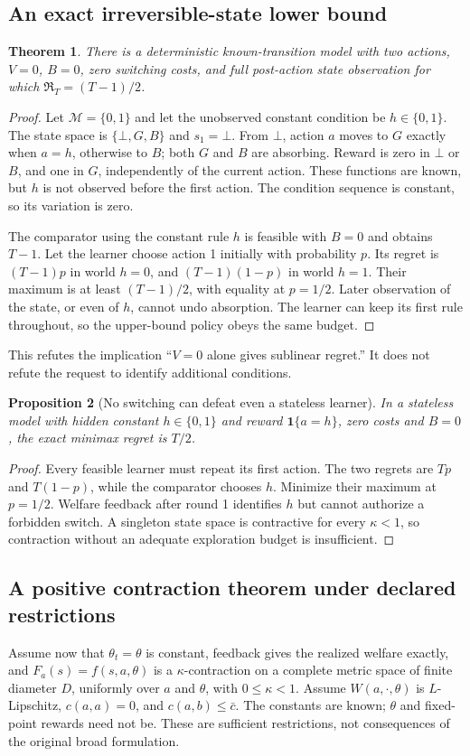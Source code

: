 \documentclass[11pt,a4paper]{article}
\newtheorem{theorem}{Theorem}[section]
\newtheorem{proposition}[theorem]{Proposition}
\theoremstyle{remark}\newtheorem{remark}[theorem]{Remark}
\newcommand{\ind}{\mathbf 1}
\begin{document}
\subsection{An exact irreversible-state lower bound}
\begin{theorem}\label{thm:absorbing}
There is a deterministic known-transition model with two actions, $V=0$, $B=0$, zero switching costs, and full post-action state observation for which $\mathfrak R_T=(T-1)/2$.
\end{theorem}
\begin{proof}
Let $\mathcal M=\{0,1\}$ and let the unobserved constant condition be $h\in\{0,1\}$. The state space is $\{\bot,G,B\}$ and $s_1=\bot$. From $\bot$, action $a$ moves to $G$ exactly when $a=h$, otherwise to $B$; both $G$ and $B$ are absorbing. Reward is zero in $\bot$ or $B$, and one in $G$, independently of the current action. These functions are known, but $h$ is not observed before the first action. The condition sequence is constant, so its variation is zero.

The comparator using the constant rule $h$ is feasible with $B=0$ and obtains $T-1$. Let the learner choose action 1 initially with probability $p$. Its regret is $(T-1)p$ in world $h=0$, and $(T-1)(1-p)$ in world $h=1$. Their maximum is at least $(T-1)/2$, with equality at $p=1/2$. Later observation of the state, or even of $h$, cannot undo absorption. The learner can keep its first rule throughout, so the upper-bound policy obeys the same budget.
\end{proof}
This refutes the implication ``$V=0$ alone gives sublinear regret.'' It does not refute the request to identify additional conditions.

\begin{proposition}[No switching can defeat even a stateless learner]
In a stateless model with hidden constant $h\in\{0,1\}$ and reward $\ind\{a=h\}$, zero costs and $B=0$, the exact minimax regret is $T/2$.
\end{proposition}
\begin{proof}
Every feasible learner must repeat its first action. The two regrets are $Tp$ and $T(1-p)$, while the comparator chooses $h$. Minimize their maximum at $p=1/2$. Welfare feedback after round 1 identifies $h$ but cannot authorize a forbidden switch. A singleton state space is contractive for every $\kappa<1$, so contraction without an adequate exploration budget is insufficient.
\end{proof}

\subsection{A positive contraction theorem under declared restrictions}
Assume now that $\theta_t=\theta$ is constant, feedback gives the realized welfare exactly, and $F_a(s)=f(s,a,\theta)$ is a $\kappa$-contraction on a complete metric space of finite diameter $D$, uniformly over $a$ and $\theta$, with $0\le\kappa<1$. Assume $W(a,\cdot,\theta)$ is $L$-Lipschitz, $c(a,a)=0$, and $c(a,b)\le\bar c$. The constants are known; $\theta$ and fixed-point rewards need not be. These are sufficient restrictions, not consequences of the original broad formulation.
\end{document}
